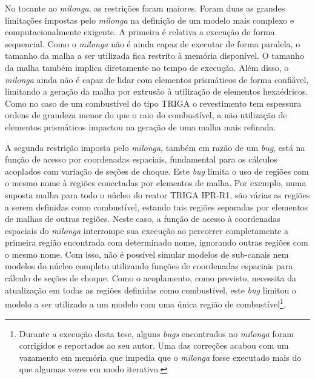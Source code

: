 No tocante ao \textit{milonga}, as restrições foram maiores. Foram duas as grandes limitações impostas
pelo \textit{milonga} na definição de um modelo mais complexo e computacionalmente exigente. A primeira
é relativa a execução de forma sequencial. Como o \textit{milonga} não é ainda capaz de executar de
forma paralela, o tamanho da malha a ser utilizada fica restrito à memória disponível.
O tamanho da malha também implica diretamente no tempo de execução.
Além disso, o \textit{milonga} ainda não é capaz de lidar com elementos prismáticos de forma confiável, limitando a
geração da malha por extrusão à utilização de elementos hexaédricos.
Como no caso de um combustível do tipo TRIGA o revestimento tem espessura ordens de grandeza
menor do que o raio do combustível, a não utilização de elementos prismáticos impactou na geração
de uma malha mais refinada.

A segunda restrição imposta pelo \textit{milonga}, também em razão de um \textit{bug}, está na função
de acesso por coordenadas espaciais, fundamental para os cálculos acoplados com variação de seções de choque.
Este \textit{bug} limita o uso de regiões com o mesmo nome à regiões conectadas por elementos de malha.
Por exemplo, numa suposta malha para todo o núcleo do reator TRIGA IPR-R1, são várias as regiões a serem definidas
como combustível, estando
tais regiões separadas por elementos de malhas de outras regiões. Neste caso, a função de acesso
à coordenadas espaciais do \textit{milonga} interrompe sua execução ao percorrer completamente a primeira
região encontrada com determinado nome, ignorando outras regiões com o mesmo nome.
Com isso, não é possível simular modelos de sub-canais
nem modelos do núcleo completo utilizando funções de coordenadas espaciais para cálculo de seções de choque.
Como o acoplamento, como previsto, necessita da atualização em todas as regiões definidas como combustível,
este \textit{bug} limitou o modelo a ser utilizado a um modelo com uma única região de
combustível\footnote{Durante a execução desta tese, alguns \textit{bugs} encontrados
  no \textit{milonga} foram corrigidos e
  reportados ao seu autor. Uma das correções acabou com um vazamento em memória que impedia que o \textit{milonga}
  fosse executado mais do que algumas vezes em modo iterativo.}.





